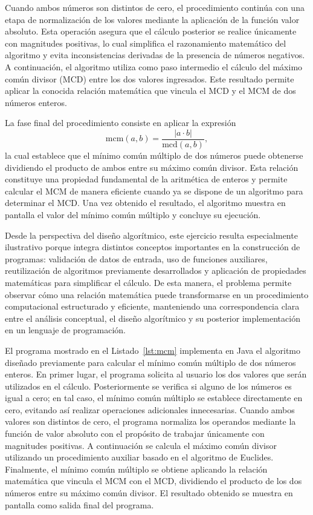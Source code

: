 \documentclass[12pt,twoside]{book}
\begin{document}
					Cuando ambos números son distintos de cero, el procedimiento continúa con una etapa de normalización de los valores mediante la aplicación de la función valor absoluto. Esta operación asegura que el cálculo posterior se realice únicamente con magnitudes positivas, lo cual simplifica el razonamiento matemático del algoritmo y evita inconsistencias derivadas de la presencia de números negativos. A continuación, el algoritmo utiliza como paso intermedio el cálculo del máximo común divisor (MCD) entre los dos valores ingresados. Este resultado permite aplicar la conocida relación matemática que vincula el MCD y el MCM de dos números enteros.
					
					La fase final del procedimiento consiste en aplicar la expresión
					\[
					\text{mcm}(a,b) = \frac{|a \cdot b|}{\text{mcd}(a,b)},
					\]
					la cual establece que el mínimo común múltiplo de dos números puede obtenerse dividiendo el producto de ambos entre su máximo común divisor. Esta relación constituye una propiedad fundamental de la aritmética de enteros y permite calcular el MCM de manera eficiente cuando ya se dispone de un algoritmo para determinar el MCD. Una vez obtenido el resultado, el algoritmo muestra en pantalla el valor del mínimo común múltiplo y concluye su ejecución.
					
					Desde la perspectiva del diseño algorítmico, este ejercicio resulta especialmente ilustrativo porque integra distintos conceptos importantes en la construcción de programas: validación de datos de entrada, uso de funciones auxiliares, reutilización de algoritmos previamente desarrollados y aplicación de propiedades matemáticas para simplificar el cálculo. De esta manera, el problema permite observar cómo una relación matemática puede transformarse en un procedimiento computacional estructurado y eficiente, manteniendo una correspondencia clara entre el análisis conceptual, el diseño algorítmico y su posterior implementación en un lenguaje de programación.
					
					\noindent
					El programa mostrado en el Listado~\ref{lst:mcm} implementa en Java el algoritmo diseñado previamente para calcular el mínimo común múltiplo de dos números enteros. En primer lugar, el programa solicita al usuario los dos valores que serán utilizados en el cálculo. Posteriormente se verifica si alguno de los números es igual a cero; en tal caso, el mínimo común múltiplo se establece directamente en cero, evitando así realizar operaciones adicionales innecesarias. Cuando ambos valores son distintos de cero, el programa normaliza los operandos mediante la función de valor absoluto con el propósito de trabajar únicamente con magnitudes positivas. A continuación se calcula el máximo común divisor utilizando un procedimiento auxiliar basado en el algoritmo de Euclides. Finalmente, el mínimo común múltiplo se obtiene aplicando la relación matemática que vincula el MCM con el MCD, dividiendo el producto de los dos números entre su máximo común divisor. El resultado obtenido se muestra en pantalla como salida final del programa.
					
\end{document}
